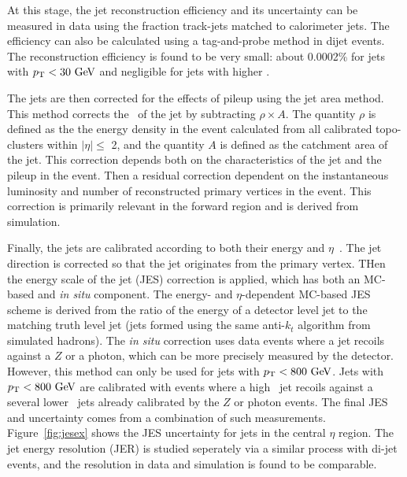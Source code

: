 At this stage, the jet reconstruction efficiency and its uncertainty can be measured in data using the fraction track-jets matched to calorimeter jets. The efficiency can also be calculated using a tag-and-probe method in dijet events. The reconstruction efficiency is found to be very small: about 0.0002\% for jets with $\pt< 30 \gev$ and negligible for jets with higher \pt.

The jets are then corrected for the effects of pileup using the jet area method. This method corrects the \pt\ of the jet by subtracting $\rho\times A$. The quantity $\rho$ is defined as the  the energy density in the event calculated from all calibrated topo-clusters within $|\eta|\leq$ 2, and the quantity $A$ is defined as the catchment area of the jet. This correction depends both on the characteristics of the jet and the pileup in the event. Then a residual correction dependent on the instantaneous luminosity and number of reconstructed primary vertices in the event. This correction is primarily relevant in the forward region and is derived from simulation.

Finally, the jets are calibrated according to both their energy and $\eta$~\cite{JES}. The jet direction is corrected so that the jet originates from the primary vertex. THen the energy scale of the jet (JES) correction is applied, which has both an MC-based and \emph{in situ} component. The energy- and $\eta$-dependent MC-based JES scheme is derived from the ratio of the energy of a detector level jet to the matching truth level jet (jets formed using the same anti-$k_t$ algorithm from simulated hadrons). The \emph{in situ} correction uses data events where a jet recoils against a $Z$ or a photon, which can be more precisely measured by the detector. However, this method can only be used for jets with $\pt<800 \gev$. Jets with $\pt<800 \gev$ are calibrated with events where a high \pt\ jet recoils against a several lower \pt\ jets already calibrated by the $Z$ or photon events. The final JES and uncertainty comes from a combination of such measurements. Figure~\ref{fig:jesex} shows the JES uncertainty for jets in the central $\eta$ region. The jet energy resolution (JER) is studied seperately via a similar process with di-jet events, and the resolution in data and simulation is found to be comparable.






